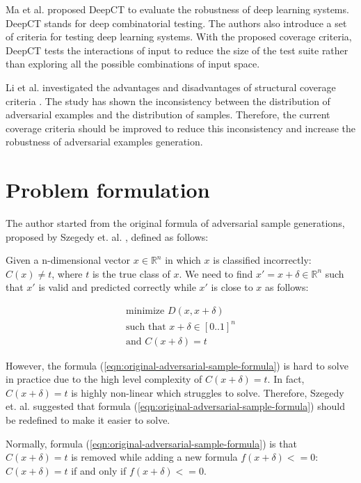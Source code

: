 \documentclass[12pt]{article}
\begin{document}
Ma et al. proposed DeepCT \cite{deepct} to evaluate the robustness of deep learning systems. DeepCT stands for deep combinatorial testing. The authors also introduce a set of criteria for testing deep learning systems. With the proposed coverage criteria, DeepCT tests the interactions of input to reduce the size of the test suite rather than exploring all the possible combinations of input space.

Li et al. investigated the advantages and disadvantages of structural coverage criteria \cite{coverage-limiation}. The study has shown the inconsistency between the distribution of adversarial examples and the distribution of samples. Therefore, the current coverage criteria should be improved to reduce this inconsistency and increase the robustness of adversarial examples generation.

\section{Problem formulation}

The author started from the original formula of adversarial sample generations, proposed by Szegedy et. al. \cite{42503}, defined as follows:

Given a n-dimensional vector $x \in \mathbb{R}^n$ in which $x$ is classified incorrectly: $C(x) \ne t$, where $t$ is the true class of $x$. We need to find $x' = x + \delta \in \mathbb{R}^n$ such that $x'$ is valid and predicted correctly while $x'$ is close to $x$ as follows:

\begin{equation}
\begin{split}
\label{eqn:original-adversarial-sample-formula}
\text{minimize } D(x, x + \delta)
\\
\text{such that } x + \delta \in [0..1]^n
\\
\text{and } C(x+\delta) = t
\end{split}
\end{equation}

However, the formula (\ref{eqn:original-adversarial-sample-formula}) is hard to solve in practice due to the high level complexity of $C(x+\delta) = t$. In fact, $C(x+\delta) = t$ is highly non-linear which struggles to solve. Therefore, Szegedy et. al. suggested that formula (\ref{eqn:original-adversarial-sample-formula}) should be redefined to make it easier to solve.

Normally, formula (\ref{eqn:original-adversarial-sample-formula}) is that  $C(x+\delta) = t$ is removed while adding a new formula $f(x+\delta) <= 0$: $C(x+\delta) = t$ if and only if $f(x+\delta) <= 0$.
\end{document}

